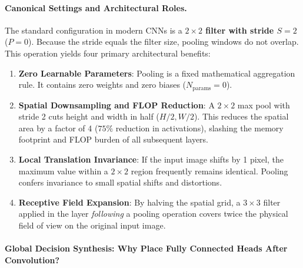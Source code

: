 \paragraph{Canonical Settings and Architectural Roles.}
The standard configuration in modern CNNs is a \textbf{$2 \times 2$ filter with stride $S = 2$} ($P = 0$). Because the stride equals the filter size, pooling windows do not overlap.
This operation yields four primary architectural benefits:
\begin{enumerate}
  \item \textbf{Zero Learnable Parameters}: Pooling is a fixed mathematical aggregation rule. It contains zero weights and zero biases ($N_{\text{params}} = 0$).
  \item \textbf{Spatial Downsampling and FLOP Reduction}: A $2 \times 2$ max pool with stride 2 cuts height and width in half ($H/2, W/2$). This reduces the spatial area by a factor of 4 ($75\%$ reduction in activations), slashing the memory footprint and FLOP burden of all subsequent layers.
  \item \textbf{Local Translation Invariance}: If the input image shifts by 1 pixel, the maximum value within a $2 \times 2$ region frequently remains identical. Pooling confers invariance to small spatial shifts and distortions.
  \item \textbf{Receptive Field Expansion}: By halving the spatial grid, a $3 \times 3$ filter applied in the layer \textit{following} a pooling operation covers twice the physical field of view on the original input image.
\end{enumerate}

\paragraph{Global Decision Synthesis: Why Place Fully Connected Heads After Convolution?}
\label{sec:why_fcn_after_cnn}

